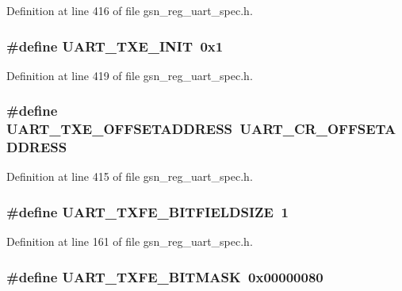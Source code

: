 Definition at line 416 of file gsn\_\-reg\_\-uart\_\-spec.h.

\hypertarget{a00575_aec4c902443bce23f9aeb5d37173c30a1}{
\subsubsection[{UART\_\-TXE\_\-INIT}]{\setlength{\rightskip}{0pt plus 5cm}\#define UART\_\-TXE\_\-INIT~0x1}}
\label{a00575_aec4c902443bce23f9aeb5d37173c30a1}


Definition at line 419 of file gsn\_\-reg\_\-uart\_\-spec.h.

\hypertarget{a00575_ac7594b7d774a1843cdbb5455f8c4be8a}{
\subsubsection[{UART\_\-TXE\_\-OFFSETADDRESS}]{\setlength{\rightskip}{0pt plus 5cm}\#define UART\_\-TXE\_\-OFFSETADDRESS~UART\_\-CR\_\-OFFSETADDRESS}}
\label{a00575_ac7594b7d774a1843cdbb5455f8c4be8a}


Definition at line 415 of file gsn\_\-reg\_\-uart\_\-spec.h.

\hypertarget{a00575_abd6ec8c56f4c7a547fe79ffc24aaaba2}{
\subsubsection[{UART\_\-TXFE\_\-BITFIELDSIZE}]{\setlength{\rightskip}{0pt plus 5cm}\#define UART\_\-TXFE\_\-BITFIELDSIZE~1}}
\label{a00575_abd6ec8c56f4c7a547fe79ffc24aaaba2}


Definition at line 161 of file gsn\_\-reg\_\-uart\_\-spec.h.

\hypertarget{a00575_af900882c4c51863f8698d414935069f3}{
\subsubsection[{UART\_\-TXFE\_\-BITMASK}]{\setlength{\rightskip}{0pt plus 5cm}\#define UART\_\-TXFE\_\-BITMASK~0x00000080}}
\label{a00575_af900882c4c51863f8698d414935069f3}


